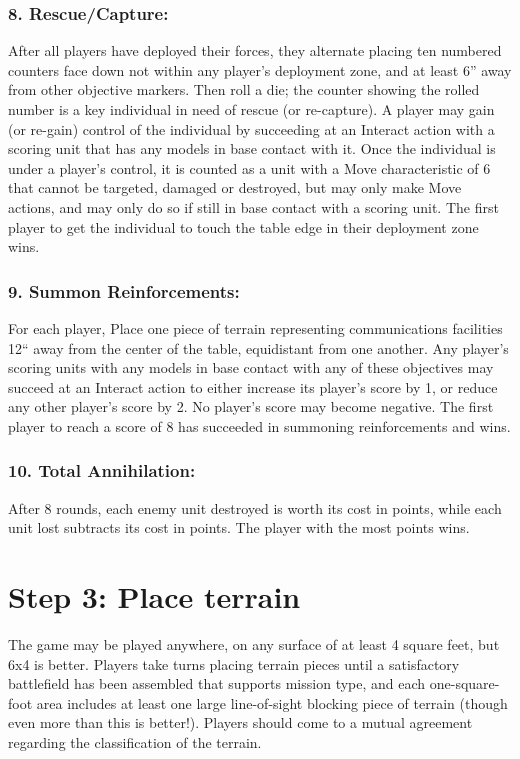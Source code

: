 \begin{multicols}{2}
\subsubsection*{8. Rescue/Capture:} After all players have deployed their forces, they alternate placing ten numbered counters face down not within any player's deployment zone, and at least 6'' away from other objective markers. Then roll a die; the counter showing the rolled number is a key individual in need of rescue (or re-capture). A player may gain (or re-gain) control of the individual by succeeding at an Interact action with a scoring unit that has any models in base contact with it. Once the individual is under a player's control, it is counted as a unit with a Move characteristic of 6 that cannot be targeted, damaged or destroyed, but may only make Move actions, and may only do so if still in base contact with a scoring unit. The first player to get the individual to touch the table edge in their deployment zone wins.

\subsubsection*{9. Summon Reinforcements:} For each player, Place one piece of terrain representing communications facilities 12`` away from the center of the table, equidistant from one another. Any player's scoring units with any models in base contact with any of these objectives may succeed at an Interact action to either increase its player's score by 1, or reduce any other player's score by 2. No player's score may become negative. The first player to reach a score of 8 has succeeded in summoning reinforcements and wins.

\subsubsection*{10. Total Annihilation:} After 8 rounds, each enemy unit destroyed is worth its cost in points, while each unit lost subtracts its cost in points. The player with the most points wins.




\section*{Step 3: Place terrain}
The game may be played anywhere, on any surface of at least 4 square feet, but 6x4 is better. Players take turns placing terrain pieces until a satisfactory battlefield has been assembled that supports mission type, and each one-square-foot area includes at least one large line-of-sight blocking piece of terrain (though even more than this is better!). Players should come to a mutual agreement regarding the classification of the terrain.





\end{multicols}
